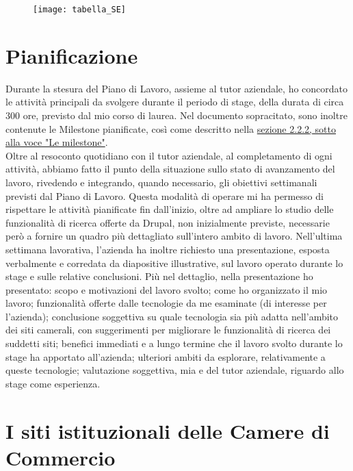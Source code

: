 	\begin{figure}[htbp]
		\begin{center}
			\texttt{[image: tabella\_SE]}
		\end{center}
	\end{figure}
	
	\section{Pianificazione}
	Durante la stesura del Piano di Lavoro, assieme al tutor aziendale, ho concordato le attività principali da svolgere durante il periodo di stage, della durata di circa 300 ore, previsto dal mio corso di laurea. Nel documento sopracitato, sono inoltre contenute le \gls{Milestone} pianificate, così come descritto nella \hyperref[subsub:milestone]{sezione 2.2.2, sotto alla voce "Le milestone"}. \\
	Oltre al resoconto quotidiano con il tutor aziendale, al completamento di ogni attività, abbiamo fatto il punto della situazione sullo stato di avanzamento del lavoro, rivedendo e integrando, quando necessario, gli obiettivi settimanali previsti dal Piano di Lavoro. Questa modalità di operare mi ha permesso di rispettare le attività pianificate fin dall'inizio, oltre ad ampliare lo studio delle funzionalità di ricerca offerte da \gls{Drupal}, non inizialmente previste, necessarie però a fornire un quadro più dettagliato sull'intero ambito di lavoro.
	Nell'ultima settimana lavorativa, l'azienda ha inoltre richiesto una presentazione, esposta verbalmente e corredata da diapositive illustrative, sul lavoro operato durante lo stage e sulle relative conclusioni. Più nel dettaglio, nella presentazione ho presentato: scopo e motivazioni del lavoro svolto; come ho organizzato il mio lavoro; funzionalità offerte dalle tecnologie da me esaminate (di interesse per l'azienda); conclusione soggettiva su quale tecnologia sia più adatta nell'ambito dei siti camerali, con suggerimenti per migliorare le funzionalità di ricerca dei suddetti siti; benefici immediati e a lungo termine che il lavoro svolto durante lo stage ha apportato all'azienda; ulteriori ambiti da esplorare, relativamente a queste tecnologie; valutazione soggettiva, mia e del tutor aziendale, riguardo allo stage come esperienza. \\
	
	\section{I siti istituzionali delle Camere di Commercio}

